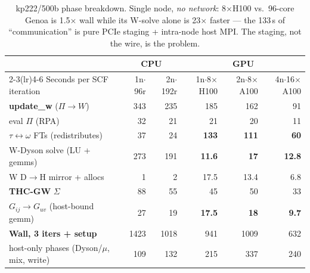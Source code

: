 \documentclass[11pt]{article}
\begin{document}
\begin{table}[H]\small\centering
\begin{tabular}{@{}lrrrrr@{}}
\toprule
& \multicolumn{2}{c}{\textcolor{cpuc}{CPU}} & \multicolumn{3}{c}{\textcolor{gpu}{GPU}} \\
\cmidrule(lr){2-3}\cmidrule(lr){4-6}
Seconds per SCF iteration & 1n$\cdot$96r & 2n$\cdot$192r & 1n$\cdot$8$\times$H100 & 2n$\cdot$8$\times$A100 & 4n$\cdot$16$\times$A100 \\
\midrule
\textbf{update\_w} ($\Pi \rightarrow W$) & 343 & 235 & 185 & 162 & 91 \\
\quad eval $\Pi$ (RPA) & 32 & 21 & 21 & 20 & 11 \\
\quad $\tau\!\leftrightarrow\!\omega$ FTs (redistributes) & 37 & 24 & \textcolor{bad}{\textbf{133}} & \textcolor{bad}{\textbf{111}} & \textcolor{bad}{\textbf{60}} \\
\quad W-Dyson solve (LU + gemms) & 273 & 191 & \textcolor{good}{\textbf{11.6}} & \textcolor{good}{\textbf{17}} & \textcolor{good}{\textbf{12.8}} \\
\quad W D$\rightarrow$H mirror + allocs & 1 & 2 & 17.5 & 13.4 & 6.8 \\
\textbf{THC-GW} $\Sigma$ & 88 & 55 & 45 & 50 & 33 \\
\quad $G_{ij}\!\rightarrow\!G_{uv}$ (host-bound gemm) & 27 & 19 & \textcolor{bad}{\textbf{17.5}} & \textcolor{bad}{\textbf{18}} & \textcolor{bad}{\textbf{9.7}} \\
\midrule
\textbf{Wall, 3 iters + setup} & 1423 & 1018 & 941 & 1009 & 632 \\
\quad host-only phases (Dyson/$\mu$, mix, write) & 109 & 132 & 215 & 337 & 240 \\
\bottomrule
\end{tabular}
\caption{kp222/500b phase breakdown. Single node, \emph{no network}: 8$\times$H100 vs.\
96-core Genoa is 1.5$\times$ wall while its W-solve alone is 23$\times$ faster ---
the 133\,s of ``communication'' is pure PCIe staging + intra-node host MPI.
The staging, not the wire, is the problem.}
\end{table}
\end{document}
